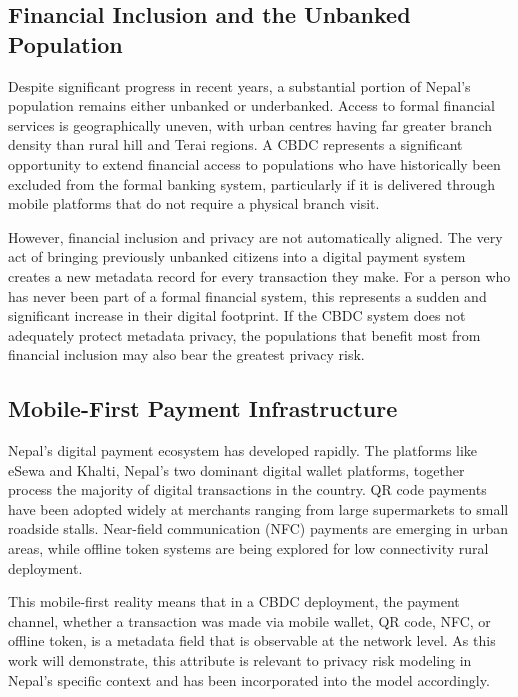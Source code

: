 \subsection{Financial Inclusion and the Unbanked Population}

Despite significant progress in recent years, a substantial
portion of Nepal's population remains either unbanked or
underbanked. Access to formal financial services is
geographically uneven, with urban centres having far greater
branch density than rural hill and Terai regions. A CBDC
represents a significant opportunity to extend financial
access to populations who have historically been excluded
from the formal banking system, particularly if it is
delivered through mobile platforms that do not require a
physical branch visit.

However, financial inclusion and privacy are not automatically
aligned. The very act of bringing previously unbanked citizens
into a digital payment system creates a new metadata record
for every transaction they make. For a person who has never
been part of a formal financial system, this represents a
sudden and significant increase in their digital footprint.
If the CBDC system does not adequately protect metadata
privacy, the populations that benefit most from financial
inclusion may also bear the greatest privacy risk.

\subsection{Mobile-First Payment Infrastructure}

Nepal's digital payment ecosystem has developed rapidly. The platforms like eSewa and Khalti, Nepal's two
dominant digital wallet platforms, together process the
majority of digital transactions in the country. QR code
payments have been adopted widely at merchants ranging from
large supermarkets to small roadside stalls. Near-field
communication (NFC) payments are emerging in urban areas,
while offline token systems are being explored for low
connectivity rural deployment.

This mobile-first reality means that in a CBDC deployment,
the payment channel, whether a transaction was made via
mobile wallet, QR code, NFC, or offline token, is a
metadata field that is observable at the network level. As
this work will demonstrate, this attribute is relevant to
privacy risk modeling in Nepal's specific context and has
been incorporated into the model accordingly.

